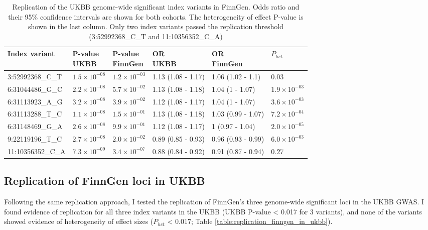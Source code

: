 \begin{table}[H]
  \centering\begingroup\fontsize{10}{12}\selectfont
  
  \caption[Replication of the UKBB genome-wide significant index variants in FinnGen]{Replication of the UKBB genome-wide significant index variants in FinnGen. Odds ratio and their 95\% confidence intervals are shown for both cohorts. The heterogeneity of effect P-value is shown in the last column. Only two index variants passed the replication threshold (3:52992368\_C\_T  and 11:10356352\_C\_A)}
  \label{table:replication_ukbb_in_finngen}
  \begin{tabular}[t]{llllll}
  \toprule
  Index variant & \makecell{P-value\\ UKBB} & \makecell{P-value\\ FinnGen} & \makecell{OR\\ UKBB} & \makecell{OR\\ FinnGen} & $P_{het}$\\
  \midrule
  3:52992368\_C\_T & $1.5\times10^{-08}$ & $1.2\times10^{-03}$ & 1.13 (1.08 - 1.17) & 1.06 (1.02 - 1.1) & $0.03$\\
  6:31044486\_G\_C & $2.2\times10^{-08}$ & $5.7\times10^{-02}$ & 1.13 (1.08 - 1.18) & 1.04 (1 - 1.07) & $1.9\times10^{-03}$\\
  6:31113923\_A\_G & $3.2\times10^{-08}$ & $3.9\times10^{-02}$ & 1.12 (1.08 - 1.17) & 1.04 (1 - 1.07) & $3.6\times10^{-03}$\\
  6:31113288\_T\_C & $1.1\times10^{-08}$ & $1.5\times10^{-01}$ & 1.13 (1.08 - 1.18) & 1.03 (0.99 - 1.07) & $7.2\times10^{-04}$\\
  6:31148469\_G\_A & $2.6\times10^{-08}$ & $9.9\times10^{-01}$ & 1.12 (1.08 - 1.17) & 1 (0.97 - 1.04) & $2.0\times10^{-05}$\\
  9:22119196\_T\_C & $2.7\times10^{-08}$ & $2.0\times10^{-02}$ & 0.89 (0.85 - 0.93) & 0.96 (0.93 - 0.99) & $6.0\times10^{-03}$\\
  11:10356352\_C\_A & $7.3\times10^{-09}$ & $3.4\times10^{-07}$ & 0.88 (0.84 - 0.92) & 0.91 (0.87 - 0.94) & $0.27$\\
  \bottomrule
  \end{tabular}
  \endgroup{}
  \end{table}




  \subsection{Replication of FinnGen loci in UKBB}
  Following the same replication approach, I tested the replication of FinnGen's three genome-wide significant loci in the UKBB GWAS. I found evidence of replication for all three index variants in the UKBB (UKBB P-value < 0.017 for 3 variants), and none of the variants showed evidence of heterogeneity of effect sizes ($P_{het}$ < 0.017; Table \ref{table:replication_finngen_in_ukbb}).

